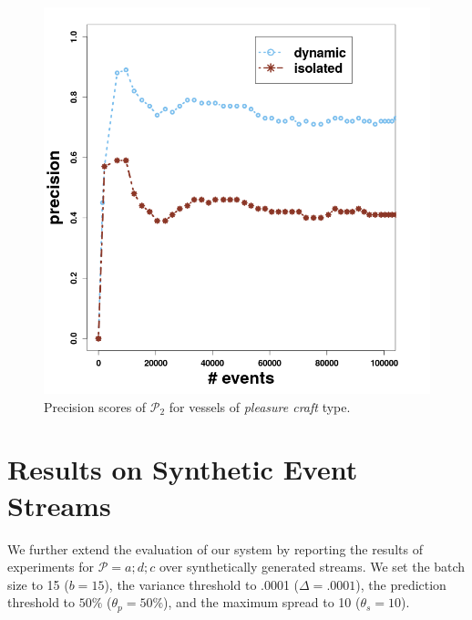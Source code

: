 \begin{figure}[H]
	\centering
	\includegraphics[width=\textwidth,height=.55\textheight]{chapters/figures/synopses/p2_precision_100_2_08.png}
	
	\caption{Precision scores of $\mathcal{P}_2$  for vessels of \textit{pleasure craft} type.}
	\label{fig:precsions_p2}
\end{figure}

\section{Results on Synthetic Event Streams}
\label{sec:results_synthetic}

We further extend the evaluation of our system by reporting the results of experiments for $\mathcal{P}=a ; d ; c$ over synthetically generated streams. We set the batch size to 15 ($b=15$), the variance threshold to .0001 ($\Delta=.0001$), the  \pmcmr prediction threshold to $50\%$ ($\theta_{p}=50\%$), and the maximum spread to 10 ($\theta_{s}=10$).

